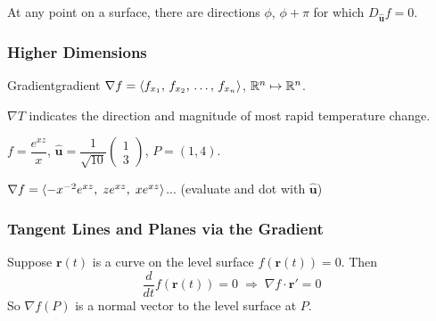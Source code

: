 At any point on a surface, there are directions $\phi$, $\phi+\pi$ for which $D_{\hat{\mathbf{u}}}f=0$.

\subsubsection{Higher Dimensions}

\begin{definition}{Gradient}{gradient}
  $\nabla f = \langle f_{x_{1}},\,f_{x_{2}},\,\dots,\,f_{x_{n}} \rangle$, \;
  $\mathbb{R}^{n}\mapsto\mathbb{R}^{n}$.
\end{definition}

\begin{example}
  $\nabla T$ indicates the direction and magnitude of most rapid temperature change.
\end{example}

\begin{example}
  $f = \dfrac{e^{xz}}{x}$, \;
  $\hat{\mathbf{u}}=\dfrac{1}{\sqrt{10}}
    \begin{pmatrix}
      1 \\3
    \end{pmatrix}
  $, \;
  $P=(1,4)$.

  $\nabla f = \langle -x^{-2}e^{xz},\; ze^{xz},\; xe^{xz} \rangle$... (evaluate and dot with $\hat{\mathbf{u}}$)
\end{example}

\subsubsection{Tangent Lines and Planes via the Gradient}

Suppose $\mathbf{r}(t)$ is a curve on the level surface $f(\mathbf{r}(t))=0$.
Then
\[
  \frac{d}{dt}f(\mathbf{r}(t))=0
  \;\Longrightarrow\;
  \nabla f\cdot\mathbf{r}'=0
\]
So $\nabla f(P)$ is a normal vector to the level surface at $P$.

